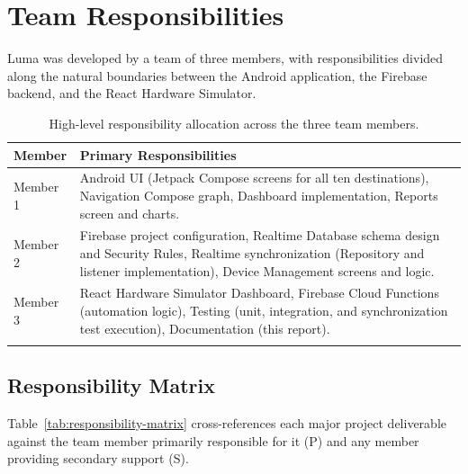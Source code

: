 \documentclass[11pt,a4paper]{article}
\begin{document}
\section{Team Responsibilities}
\label{sec:team}

Luma was developed by a team of three members, with responsibilities divided along the natural boundaries between the Android application, the Firebase backend, and the React Hardware Simulator.

\begin{longtable}{@{}p{2.6cm}p{10.6cm}@{}}
\toprule
\textbf{Member} & \textbf{Primary Responsibilities} \\
\midrule
\endhead
Member 1 & Android UI (Jetpack Compose screens for all ten destinations), Navigation Compose graph, Dashboard implementation, Reports screen and charts. \\
Member 2 & Firebase project configuration, Realtime Database schema design and Security Rules, Realtime synchronization (Repository and listener implementation), Device Management screens and logic. \\
Member 3 & React Hardware Simulator Dashboard, Firebase Cloud Functions (automation logic), Testing (unit, integration, and synchronization test execution), Documentation (this report). \\
\bottomrule
\caption{High-level responsibility allocation across the three team members.}
\label{tab:team-responsibilities}
\end{longtable}

\subsection{Responsibility Matrix}
Table~\ref{tab:responsibility-matrix} cross-references each major project deliverable against the team member primarily responsible for it (P) and any member providing secondary support (S).
\end{document}
